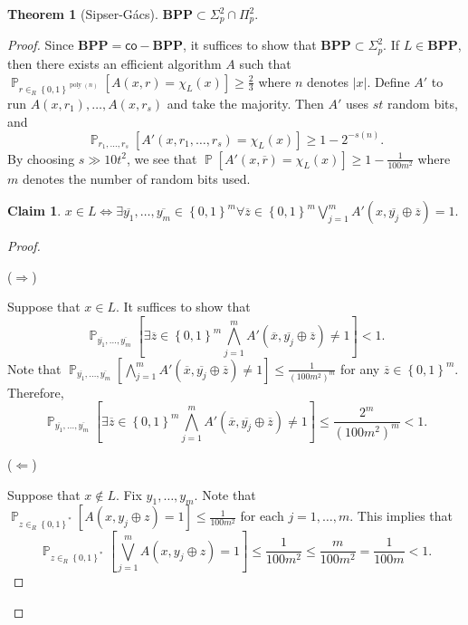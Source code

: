 \documentclass[10pt,letterpaper,cm]{nupset}
\theoremstyle{definition}
\theoremstyle{theorem}
\newtheorem{theorem}[definition]{Theorem}
\newtheorem*{claim}{Claim}
\theoremstyle{remark}
\newcommand{\1}{\mathbf{1}}
\newcommand{\0}{\vec 0}
\DeclareMathOperator{\pr}{\mathbb{P}}
\DeclareMathOperator{\poly}{poly}
\begin{document}
\begin{theorem}[Sipser-G\'acs]
$\mathbf{BPP} \subset \Sigma^2_p \cap \Pi^2_p$.
\end{theorem}
\begin{proof}
Since $\mathbf{BPP} = \mathsf{co}{-}\mathbf{BPP}$, it suffices to show that $\mathbf{BPP} \subset \Sigma^2_p$. If $L \in \mathbf{BPP}$, then there exists an efficient algorithm $A$ such that $\pr_{r \in_R \left\{0,1\right\}^{\poly(n)}}\left[A(x,r) = \chi_L(x)\right] \geq \frac{2}{3}$ where $n$ denotes $\left\lvert{x}\right\rvert$. Define $A'$ to run $A(x, r_1), \ldots, A(x, r_s)$ and take the majority. Then $A'$ uses $st$ random bits, and $$\pr_{r_1, \ldots, r_s}\left[A'(x, r_1, \ldots, r_s) =\chi_L(x)\right] \geq 1 - 2^{{-}s(n)}.$$ By choosing $s \gg 10t^2$, we see that $\pr\left[A'(x, \overline{r}) = \chi_L(x)\right] \geq 1 -\frac{1}{100m^2}$ where $m$ denotes the number of random bits used. 
\begin{claim}
$x \in L \iff \exists \overline{y_1}, \ldots, \overline{y_m} \in \left\{0,1\right\}^m \forall \overline{z} \in \left\{0,1\right\}^m \bigvee_{j=1}^m A'\left(x, \overline{y_j} \oplus \overline{z}\right)=1$.
\end{claim}

\begin{proof} $ $

($\Longrightarrow$) 

\smallskip

Suppose that $x \in L$. It suffices to show that $$   \pr_{\overline{y_1}, \ldots, \overline{y_m}} \left[\exists \overline{z} \in \left\{0,1\right\}^m \bigwedge_{j=1}^m A'\left(\overline{x}, \overline{y_j} \oplus \overline{z}\right) \ne 1 \right] <1   .$$ Note that $\pr_{\overline{y_1}, \ldots, \overline{y_m}} \left[\bigwedge_{j=1}^m  A'\left(\overline{x}, \overline{y_j} \oplus \overline{z}\right) \ne 1 \right] \leq \frac{1}{\left(100m^2\right)^m}$ for any $\overline{z} \in \left\{0,1\right\}^m$. Therefore, $$      \pr_{\overline{y_1}, \ldots, \overline{y_m}}  \left[\exists \overline{z} \in \left\{0,1\right\}^m \bigwedge_{j=1}^m A'\left(\overline{x}, \overline{y_j} \oplus \overline{z}\right) \ne 1 \right ]   \leq \frac{2^m}{(100m^2)^m} <1.$$

\medskip

($\Longleftarrow$)  

\smallskip

Suppose that $x \notin L$. Fix $y_1, \ldots, y_m$. Note that $\pr_{z \in_R \left\{0,1\right\}^{\ast}}[A(x, y_j \oplus z) =1] \leq \frac{1}{100m^2}$ for each $j=1, \ldots, m$. This implies that $$\pr_{z \in_R \left\{0,1\right\}^{\ast}}\left[\bigvee_{j=1}^m A(x, y_j \oplus z) =1\right] \leq \frac{1}{100m^2} \leq \frac{m}{100m^2} = \frac{1}{100m} <1.$$
\end{proof}
\end{proof}
\end{document}
